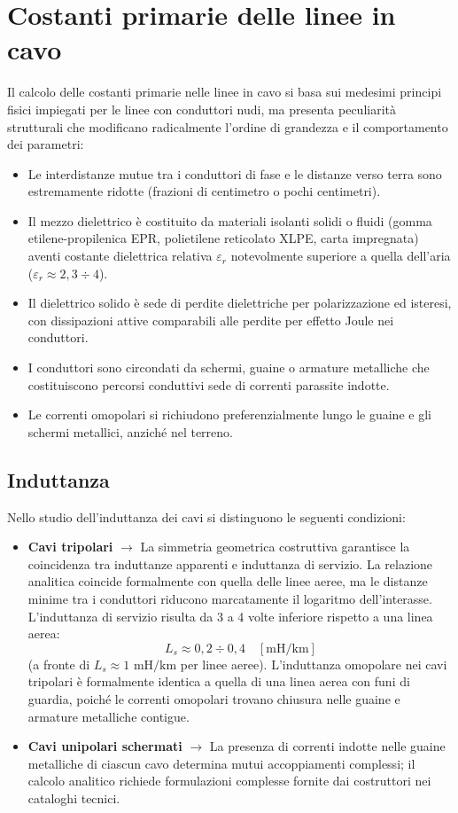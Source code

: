 \section{Costanti primarie delle linee in cavo}
Il calcolo delle costanti primarie nelle linee in cavo si basa sui medesimi principi fisici impiegati per le linee con conduttori nudi, ma presenta peculiarità strutturali che modificano radicalmente l'ordine di grandezza e il comportamento dei parametri:
\begin{itemize}
    \item Le interdistanze mutue tra i conduttori di fase e le distanze verso terra sono estremamente ridotte (frazioni di centimetro o pochi centimetri).
    \item Il mezzo dielettrico è costituito da materiali isolanti solidi o fluidi (gomma etilene-propilenica EPR, polietilene reticolato XLPE, carta impregnata) aventi costante dielettrica relativa $\varepsilon_r$ notevolmente superiore a quella dell'aria ($\varepsilon_r \approx 2{,}3 \div 4$).
    \item Il dielettrico solido è sede di perdite dielettriche per polarizzazione ed isteresi, con dissipazioni attive comparabili alle perdite per effetto Joule nei conduttori.
    \item I conduttori sono circondati da schermi, guaine o armature metalliche che costituiscono percorsi conduttivi sede di correnti parassite indotte.
    \item Le correnti omopolari si richiudono preferenzialmente lungo le guaine e gli schermi metallici, anziché nel terreno.
\end{itemize}

\subsection{Induttanza}
Nello studio dell'induttanza dei cavi si distinguono le seguenti condizioni:
\begin{itemize}
    \item \textbf{Cavi tripolari} $\rightarrow$ La simmetria geometrica costruttiva garantisce la coincidenza tra induttanze apparenti e induttanza di servizio. La relazione analitica coincide formalmente con quella delle linee aeree, ma le distanze minime tra i conduttori riducono marcatamente il logaritmo dell'interasse. L'induttanza di servizio risulta da 3 a 4 volte inferiore rispetto a una linea aerea:
    \[L_s \approx 0{,}2 \div 0{,}4 \quad [\text{mH/km}]\]
    (a fronte di $L_s \approx 1\text{ mH/km}$ per linee aeree). L'induttanza omopolare nei cavi tripolari è formalmente identica a quella di una linea aerea con funi di guardia, poiché le correnti omopolari trovano chiusura nelle guaine e armature metalliche contigue.
    \item \textbf{Cavi unipolari schermati} $\rightarrow$ La presenza di correnti indotte nelle guaine metalliche di ciascun cavo determina mutui accoppiamenti complessi; il calcolo analitico richiede formulazioni complesse fornite dai costruttori nei cataloghi tecnici.
\end{itemize}

